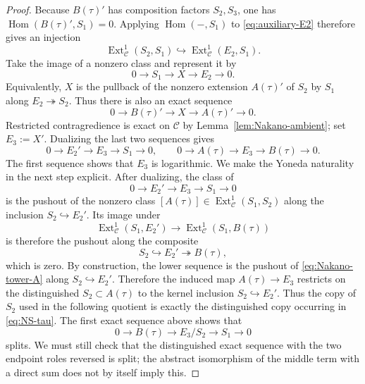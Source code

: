 \documentclass[12pt,leqno]{amsart}
\numberwithin{equation}{section}
\newcommand{\Hom}{\operatorname{Hom}}
\newcommand{\Ext}{\operatorname{Ext}}
\begin{document}
\begin{proof}
Because $B(\tau)'$ has composition factors $S_2,S_3$, one has
$\Hom(B(\tau)',S_1)=0$.  Applying $\Hom(-,S_1)$ to
\eqref{eq:auxiliary-E2} therefore gives an injection
\[
 \Ext^1_{\mathscr C}(S_2,S_1)
 \hookrightarrow
 \Ext^1_{\mathscr C}(E_2,S_1).
\]
Take the image of a nonzero class and represent it by
\[
 0\longrightarrow S_1\longrightarrow X\longrightarrow E_2
 \longrightarrow0.
\]
Equivalently, $X$ is the pullback of the nonzero extension
$A(\tau)'$ of $S_2$ by $S_1$ along $E_2\twoheadrightarrow S_2$.
Thus there is also an exact sequence
\[
 0\longrightarrow B(\tau)'\longrightarrow X
 \longrightarrow A(\tau)'\longrightarrow0.
\]
Restricted contragredience is exact on $\mathscr C$ by
Lemma~\ref{lem:Nakano-ambient}; set $E_3:=X'$.  Dualizing the last two
sequences gives
\[
 0\longrightarrow E_2'\longrightarrow E_3\longrightarrow S_1
 \longrightarrow0,
 \qquad
 0\longrightarrow A(\tau)\longrightarrow E_3\longrightarrow
 B(\tau)\longrightarrow0.
\]
The first sequence shows that $E_3$ is logarithmic.  We make the
Yoneda naturality in the next step explicit.  After dualizing, the class
of
\[
 0\to E_2'\to E_3\to S_1\to0
\]
is the pushout of the nonzero class
$[A(\tau)]\in\Ext^1_{\mathscr C}(S_1,S_2)$ along the inclusion
$S_2\hookrightarrow E_2'$.  Its image under
\[
 \Ext^1_{\mathscr C}(S_1,E_2')
 \longrightarrow
 \Ext^1_{\mathscr C}(S_1,B(\tau))
\]
is therefore the pushout along the composite
\[
 S_2\hookrightarrow E_2'\twoheadrightarrow B(\tau),
\]
which is zero.  By construction, the lower sequence is the pushout of
\eqref{eq:Nakano-tower-A} along $S_2\hookrightarrow E_2'$.  Therefore
the induced map $A(\tau)\to E_3$ restricts on the distinguished
$S_2\subset A(\tau)$ to the kernel inclusion $S_2\hookrightarrow E_2'$.
Thus the copy of $S_2$ used in the following quotient is exactly the
distinguished copy occurring in \eqref{eq:NS-tau}.  The first exact sequence above shows that
\begin{equation}\label{eq:E3-first-split}
 0\longrightarrow B(\tau)\longrightarrow E_3/S_2
 \longrightarrow S_1\longrightarrow0
\end{equation}
splits.  We must still check that the distinguished exact sequence with
the two endpoint roles reversed is split; the abstract isomorphism of the
middle term with a direct sum does not by itself imply this.


\end{proof}
\end{document}
